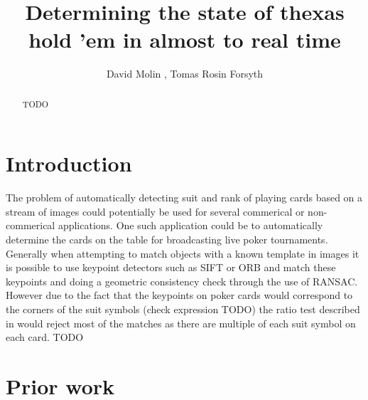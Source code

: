 \documentclass[journal,twoside]{IEEEtran}
\begin{document}
\title{Determining the state of thexas hold 'em in almost to real time}

\author{ David Molin 
, 
Tomas Rosin Forsyth 

}%

\maketitle

\begin{abstract}
TODO

\end{abstract}




\IEEEpeerreviewmaketitle



\section{Introduction}
The problem of automatically detecting suit and rank of playing cards based on a stream of images could potentially be used for  several commerical or non-commerical applications. One such application could be to automatically determine the cards on the table for broadcasting live poker tournaments.
Generally when attempting to match objects with a known template in images it is possible to use keypoint detectors such as SIFT \cite{SIFT} or ORB \cite{ORB} and match these keypoints and doing a geometric consistency check through the use of RANSAC. However due to the fact that the keypoints on poker cards would correspond to the corners of the suit symbols (check expression TODO) the ratio test described in \cite{SIFT} would reject most of the matches as there are multiple of each suit symbol on each card. TODO


\section{Prior work}
\end{document}
